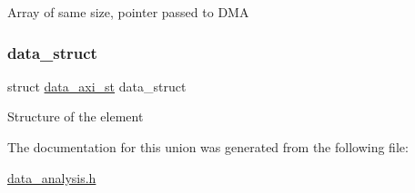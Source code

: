 Array of same size, pointer passed to D\+MA \mbox{\label{uniondata__axi__union_a36277ea8982d2b019ca86fef2b800a7b}} 
\subsubsection{\texorpdfstring{data\_struct}{data\_struct}}
{\footnotesize\ttfamily struct \mbox{\hyperlink{structdata__axi__st}{data\+\_\+axi\+\_\+st}} data\+\_\+struct}

Structure of the element 

The documentation for this union was generated from the following file\+:\begin{DoxyCompactItemize}
\item 
\mbox{\hyperlink{data__analysis_8h}{data\+\_\+analysis.\+h}}\end{DoxyCompactItemize}
